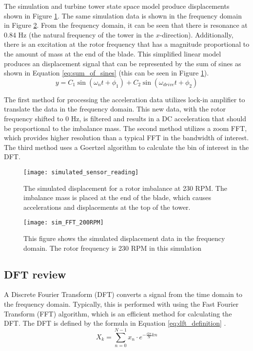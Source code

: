 The simulation and turbine tower state space model produce displacements shown in Figure \ref{fig:simulated_sensor_reading}.  The same simulation data is shown in the frequency domain  in Figure \ref{fig:sim_FFT_200RPM}.  From the frequency domain, it can be seen that there is resonance at 0.84 Hz (the natural frequency of the tower in the $x$-direction).  Additionally, there is an excitation at the rotor frequency that has a magnitude proportional to the amount of mass at the end of the blade.  This simplified linear model produces an displacement signal that can be represented by the sum of sines as shown in Equation \ref{eq:sum_of_sines} (this can be seen in Figure \ref{fig:simulated_sensor_reading}).
\begin{equation} \label{eq:sum_of_sines}
	y = C_1 \sin{(\omega_n t + \phi_1)} + C_2 \sin{(\omega_{drive} t + \phi_2)}
\end{equation}

The first method for processing the acceleration data utilizes lock-in amplifier to translate the data in the frequency domain.  This new data, with the rotor frequency shifted to 0 Hz, is filtered and results in a DC acceleration that should be proportional to the imbalance mass.  The second method utilizes a zoom FFT, which provides higher resolution than a typical FFT in the bandwidth of interest.  The third method uses a Goertzel algorithm to calculate the bin of interest in the DFT.

\begin{figure}
	\centering
	\texttt{[image: simulated\_sensor\_reading]}
	\decoRule
	\caption{The simulated displacement for a rotor imbalance at 230 RPM.  The imbalance mass is placed at the end of the blade, which causes accelerations and displacements at the top of the tower.}
	\label{fig:simulated_sensor_reading}
\end{figure}

\begin{figure}
	\centering
	\texttt{[image: sim\_FFT\_200RPM]}
	\decoRule
	\caption{This figure shows the simulated displacement data in the frequency domain.  The rotor frequency is 230 RPM in this simulation}
	\label{fig:sim_FFT_200RPM}
\end{figure}

\subsection{DFT review}
A Discrete Fourier Transform (DFT) converts a signal from the time domain to the frequency domain.  Typically, this is performed with using the Fast Fourier Transform (FFT) algorithm, which is an efficient method for calculating the DFT.  The DFT is defined by the formula in Equation \ref{eq:dft_definition} \cite{wiki_DFT}.
\begin{equation} \label{eq:dft_definition}
	X_k = \sum_{n=0}^{N-1}{x_n \cdot e^{-\frac{i 2 \pi}{N} k n}}
\end{equation}

